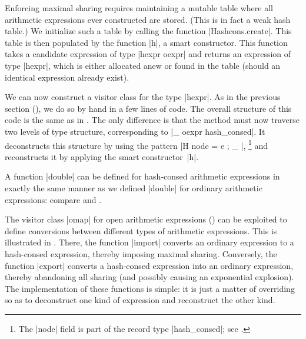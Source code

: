 \documentclass[11pt,a4paper,twoside]{article}
\begin{document}
Enforcing maximal sharing requires maintaining a mutable table where all
arithmetic expressions ever constructed are stored. (This is in fact a weak
hash table.) We initialize such a table by calling the function
\oc|Hashcons.create|. This table is then populated by the function \oc|h|, a smart
constructor.
This function takes a candidate expression of type \oc|hexpr oexpr| and
returns an expression of type \oc|hexpr|, which is either allocated anew
or found in the table (should an identical expression already exist).

We can now construct a visitor class for the type \oc|hexpr|. As in the previous
section (), we do so by hand in a few lines of code.
%
%
%
The overall structure of this code is the same as in . The
only difference is that the method  must now traverse
two levels of type structure, corresponding to \oc|_ oexpr hash_consed|.
It deconstructs this structure by using the pattern \oc|H { node = e ; _ }|,%
%
\footnote{The \oc|node| field is part of the record type \oc|hash_consed|;
see .}
%
and reconstructs it by applying the smart constructor~\oc|h|.

A function \oc|double| can be defined for hash-consed arithmetic expressions
in exactly the same manner as we defined \oc|double| for ordinary arithmetic
expressions: compare  and .
%
%

The visitor class \oc|omap| for open arithmetic expressions
() can be exploited to define conversions
between different types of arithmetic expressions.
This is illustrated in .
There, the function \oc|import| converts an ordinary expression
to a hash-consed expression, thereby imposing maximal sharing.
Conversely, the function \oc|export| converts a hash-consed
expression into an ordinary expression, thereby abandoning
all sharing (and possibly causing an exponential explosion).
The implementation of these functions is simple: it is just
a matter of overriding  so as to deconstruct
one kind of expression and reconstruct the other kind.
\end{document}
